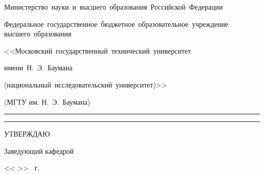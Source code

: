 \thispagestyle{empty}

\begin{center}
    \fontsize{12pt}{12pt}\selectfont
    \begin{minipage}{\textwidth}\centering\bfseries
        {
            \linespread{1}\selectfont
            \vspace{0.1cm}
            {Министерство~науки~и~высшего~образования~Российской~Федерации}

            {Федеральное~государственное~бюджетное~образовательное~учреждение высшего~образования}

            {
                <<Московский~государственный~технический~университет

                имени~Н.~Э.~Баумана

                (национальный~исследовательский~университет)>>
            }

            {(МГТУ им. Н.~Э.~Баумана)}
            \vspace{0.1cm}
        }
    \end{minipage}

    \vspace{0.2cm}
    \rule{\linewidth}{2.8pt}
    \rule[3ex]{\linewidth}{1pt}



\end{center}

\fontsize{11pt}{11pt}\selectfont
\begin{flushright}
    \begin{minipage}{0.4\textwidth}\raggedleft

        УТВЕРЖДАЮ \hspace{2.5cm}

        Заведующий кафедрой~


        \ulinetext{}{} 


        << \ulinetext[1cm]{}{} >> \ulinetext{}{} \the\year \ г.
    \end{minipage}
\end{flushright}

